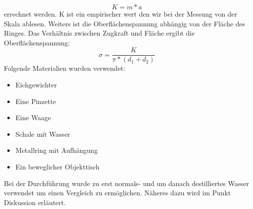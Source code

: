 \documentclass[12pt,a4paper]{article}
\begin{document}
\begin{multicols}{2}
$$K = m * a$$
errechnet werden. K ist ein empirischer wert den wir bei der Messung von der Skala ablesen.
Weiters ist die Oberflächenspannung abhängig von der Fläche des Ringes. Das Verhältnis zwischen Zugkraft und Fläche ergibt die Oberflächenspannung:
$$\sigma = \frac{K}{\pi * (d_1 + d_2)}$$
\noindent
Folgende Materialien wurden verwendet:
\begin{itemize}
	\item Eichgewichter
	\item Eine Pinzette
	\item Eine Waage
	\item Schale mit Wasser
	\item Metallring mit Aufhängung
	\item Ein beweglicher Objekttisch
\end{itemize}
Bei der Durchführung wurde zu erst normals- und um danach destilliertes Wasser verwendet um einen Vergleich zu ermöglichen. Näheres dazu wird im Punkt Diskussion erläutert.

\end{multicols}
\end{document}
